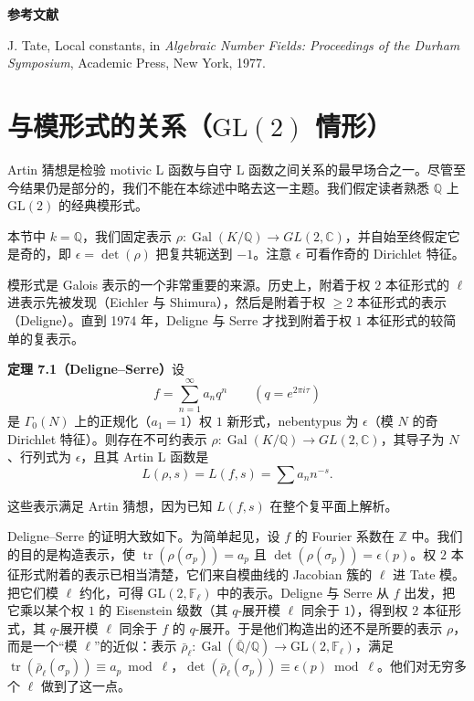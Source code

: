 {\small
\par\medskip\noindent\textbf{参考文献}\par\nopagebreak
\noindent[1] J. Tate, Local constants, in \emph{Algebraic Number Fields: Proceedings of the Durham Symposium}, Academic Press, New York, 1977.\par
}

\section{\texorpdfstring{与模形式的关系（$\mathrm{GL}(2)$ 情形）}{与模形式的关系（GL(2) 情形）}}\label{c4:sec:7}

Artin 猜想是检验 motivic L 函数与自守 L 函数之间关系的最早场合之一。尽管至今结果仍是部分的，我们不能在本综述中略去这一主题。我们假定读者熟悉 $\mathbb{Q}$ 上 $\mathrm{GL}(2)$ 的经典模形式。

本节中 $k=\mathbb{Q}$，我们固定表示 $\rho\colon\operatorname{Gal}(K/\mathbb{Q})\to GL(2,\mathbb{C})$，并自始至终假定它是奇的，即 $\epsilon=\det(\rho)$ 把复共轭送到 $-1$。注意 $\epsilon$ 可看作奇的 Dirichlet 特征。

模形式是 Galois 表示的一个非常重要的来源。历史上，附着于权 $2$ 本征形式的 $\ell$ 进表示先被发现（Eichler 与 Shimura），然后是附着于权 $\ge2$ 本征形式的表示（Deligne）。直到 1974 年，Deligne 与 Serre 才找到附着于权 $1$ 本征形式的较简单的复表示。

\par\medskip\noindent\textbf{定理 7.1（Deligne--Serre）}\quad 设
\begin{equation}\tag{7.1}\label{c4:eq:7.1}
f=\sum_{n=1}^{\infty}a_nq^{n}\qquad(q=e^{2\pi i\tau})
\end{equation}
是 $\Gamma_0(N)$ 上的正规化（$a_1=1$）权 $1$ 新形式，nebentypus 为 $\epsilon$（模 $N$ 的奇 Dirichlet 特征）。则存在不可约表示 $\rho\colon\operatorname{Gal}(K/\mathbb{Q})\to GL(2,\mathbb{C})$，其导子为 $N$、行列式为 $\epsilon$，且其 Artin L 函数是
\begin{equation}\tag{7.2}\label{c4:eq:7.2}
L(\rho,s)=L(f,s)=\sum a_nn^{-s}.
\end{equation}

这些表示满足 Artin 猜想，因为已知 $L(f,s)$ 在整个复平面上解析。

Deligne--Serre 的证明大致如下。为简单起见，设 $f$ 的 Fourier 系数在 $\mathbb{Z}$ 中。我们的目的是构造表示，使 $\operatorname{tr}(\rho(\sigma_p))=a_p$ 且 $\det(\rho(\sigma_p))=\epsilon(p)$。权 $2$ 本征形式附着的表示已相当清楚，它们来自模曲线的 Jacobian 簇的 $\ell$ 进 Tate 模。把它们模 $\ell$ 约化，可得 $\mathrm{GL}(2,\mathbb{F}_\ell)$ 中的表示。Deligne 与 Serre 从 $f$ 出发，把它乘以某个权 $1$ 的 Eisenstein 级数（其 $q$-展开模 $\ell$ 同余于 $1$），得到权 $2$ 本征形式，其 $q$-展开模 $\ell$ 同余于 $f$ 的 $q$-展开。于是他们构造出的还不是所要的表示 $\rho$，而是一个“模 $\ell$”的近似：表示 $\bar\rho_\ell\colon\operatorname{Gal}(\overline{\mathbb{Q}}/\mathbb{Q})\to\mathrm{GL}(2,\mathbb{F}_\ell)$，满足 $\operatorname{tr}(\bar\rho_\ell(\sigma_p))\equiv a_p\bmod\ell$，$\det(\bar\rho_\ell(\sigma_p))\equiv\epsilon(p)\bmod\ell$。他们对无穷多个 $\ell$ 做到了这一点。

